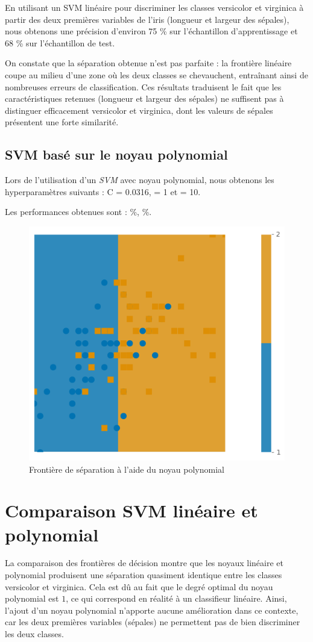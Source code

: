 \documentclass{rapport}
\begin{document}
En utilisant un SVM linéaire pour discriminer les classes versicolor et virginica à partir des deux premières variables de l’iris (longueur et largeur des sépales), nous obtenons une précision d’environ 75 \% sur l’échantillon d’apprentissage et 68 \% sur l’échantillon de test.

On constate que la séparation obtenue n’est pas parfaite : la frontière linéaire coupe au milieu d’une zone où les deux classes se chevauchent, entraînant ainsi de nombreuses erreurs de classification. Ces résultats traduisent le fait que les caractéristiques retenues (longueur et largeur des sépales) ne suffisent pas à distinguer efficacement versicolor et virginica, dont les valeurs de sépales présentent une forte similarité.
    

\subsection{SVM basé sur le noyau polynomial}

Lors de l’utilisation d’un \textit{SVM} avec noyau polynomial, nous obtenons les hyperparamètres suivants : C = 0.0316,  = 1 et \gamma = 10.

Les performances obtenues sont :  \%, \quad 
{} \%.




\begin{figure}[H]
    \centering
    \includegraphics[width=0.45\linewidth]{frontiere.png}
    \caption{Frontière de séparation à l’aide du noyau polynomial}
    \label{fig:placeholder}
\end{figure}


\section{Comparaison SVM linéaire et polynomial}

La comparaison des frontières de décision montre que les noyaux linéaire et polynomial produisent une séparation quasiment identique entre les classes versicolor et virginica. Cela est dû au fait que le degré optimal du noyau polynomial est $1$, ce qui correspond en réalité à un classifieur linéaire. Ainsi, l’ajout d’un noyau polynomial n’apporte aucune amélioration dans ce contexte, car les deux premières variables (sépales) ne permettent pas de bien discriminer les deux classes.
\end{document}
